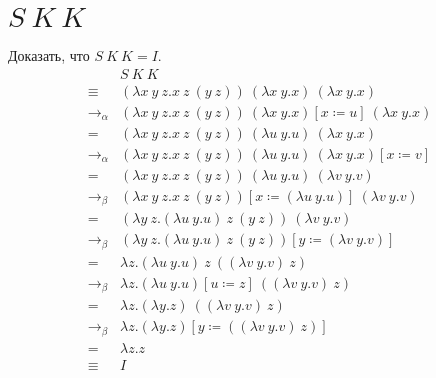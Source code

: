 \documentclass[12pt, a4paper, oneside]{memoir}
\begin{document}
\section[S K K][$S\ K\ K$]{$S\ K\ K$}
Доказать, что $S\ K\ K = I$.
\begin{align*}
                 & S\ K\ K                                                                            \\
    \equiv{}     & (\lambda x\ y\ z.x\ z\ (y\ z))\ (\lambda x\ y.x) \ (\lambda x\ y.x)                \\
    \to_\alpha{} & (\lambda x\ y\ z.x\ z\ (y\ z))\ (\lambda x\ y.x) [x \coloneq u] \ (\lambda x\ y.x) \\
    ={}          & (\lambda x\ y\ z.x\ z\ (y\ z))\ (\lambda u\ y.u)\ (\lambda x\ y.x)                 \\
    \to_\alpha{} & (\lambda x\ y\ z.x\ z\ (y\ z))\ (\lambda u\ y.u)\ (\lambda x\ y.x) [x \coloneq v]  \\
    ={}          & (\lambda x\ y\ z.x\ z\ (y\ z))\ (\lambda u\ y.u)\ (\lambda v\ y.v)                 \\
    \to_\beta{}  & (\lambda x\ y\ z.x\ z\ (y\ z)) [x \coloneq (\lambda u\ y.u)]\ (\lambda v\ y.v)     \\
    ={}          & (\lambda y\ z.(\lambda u\ y.u)\ z\ (y\ z))\ (\lambda v\ y.v)                       \\
    \to_\beta{}  & (\lambda y\ z.(\lambda u\ y.u)\ z\ (y\ z))[y \coloneq (\lambda v\ y.v)]            \\
    ={}          & \lambda z.(\lambda u\ y.u)\ z\ ((\lambda v\ y.v)\ z)                               \\
    \to_\beta{}  & \lambda z.(\lambda u\ y.u)[u \coloneq z]\ ((\lambda v\ y.v)\ z)                    \\
    ={}          & \lambda z.(\lambda y.z)\ ((\lambda v\ y.v)\ z)                                     \\
    \to_\beta{}  & \lambda z.(\lambda y.z)[y \coloneq ((\lambda v\ y.v)\ z)]                          \\
    ={}          & \lambda z.z                                                                        \\
    \equiv{}     & I
\end{align*}
\end{document}
